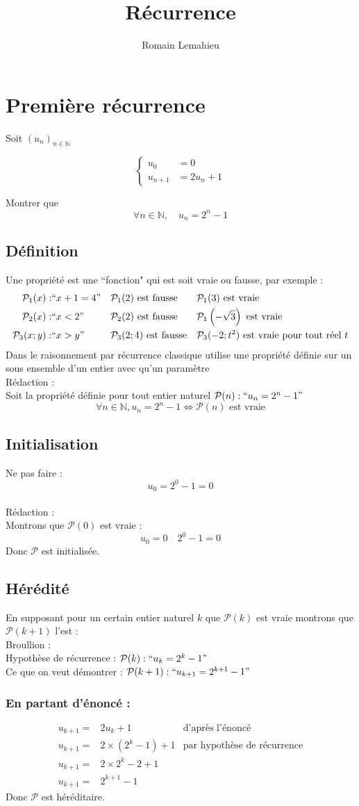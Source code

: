\documentclass{exam}
\title{Récurrence}
\author{Romain Lemahieu}
\newcommand*{\p}{\mathcal{P}}
\newcommand*{\n}{\mathbb{N}}
\newcommand*{\sys}[1]{
$$
\begin{cases}
#1
\end{cases}
$$
}
\begin{document}
\maketitle
\section{Première récurrence}
Soit $(u_n)_{n \in \n}$ 
\sys{
  u_0&=0\\
  u_{n+1}&=2u_n+1
}
Montrer que
$$
\forall n\in\n,
\quad
u_n=2^n-1
$$
\subsection{Définition}
Une propriété est une ``fonction" qui est soit vraie ou fausse, par exemple :
\begin{align*}
\p_1(x):&``x+1=4"
&&
\p_1(2)
\text{ est fausse}
&&
\p_1(3)
\text{ est vraie}
\\
\p_2(x):&``x<2"
&&
\p_2(2)
\text{ est fausse}
&&
\p_1\left(-\sqrt{3}\right)
\text{ est vraie}
\\
\p_3(x;y):&``x>y"
&&
\p_3(2;4)
\text{ est fausse}
&&
\p_3(-2;t^2)
\text{ est vraie pour tout réel }t
\end{align*}
Dans le raisonnement par récurrence classique utilise une propriété définie
sur un sous ensemble d'un entier avec qu'un paramètre
\\
Rédaction : 
\\
Soit la propriété définie pour tout entier naturel
$\p(n):``u_n=2^n-1"$
$$
\forall n\in\n,
u_n=2^n-1
\Leftrightarrow
\p(n) \text{ est vraie}
$$
\subsection{Initialisation}
Ne pas faire :
$$
u_0=2^0-1=0
$$
\\
Rédaction :
\\
Montrons que $\p(0)$ est vraie :
$$
u_0=0 \quad 2^0-1=0
$$
Donc $\p$ est initialisée.
\subsection{Hérédité}
En supposant pour un certain entier naturel $k$ que $\p(k)$ est vraie
montrons que $\p(k+1)$ l'est :
\\
Broullion :
\\
Hypothèse de récurrence : $\p(k):``u_k=2^k-1"$
\\
Ce que on veut démontrer : $\p(k+1):``u_{k+1}=2^{k+1}-1"$

\subsubsection{En partant d'énoncé :}
\begin{align*}
u_{k+1}=&2u_k+1
&
\text{d'après l'énoncé}
\\
u_{k+1}=&2\times(2^k-1)+1
&
\text{par hypothèse de récurrence}
\\
u_{k+1}=&2\times2^k-2+1
\\
u_{k+1}=&2^{k+1}-1
\end{align*}
Donc $\p$ est héréditaire.
\end{document}
